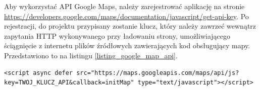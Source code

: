 Aby wykorzystać API Google Maps, należy zarejestrować aplikację na stronie \url{https://developers.google.com/maps/documentation/javascript/get-api-key}. Po rejestracji, do projektu przypisany zostanie klucz, który należy zawrzeć wewnątrz zapytania HTTP wykonywanego przy ładowaniu strony, umożliwiającego ściągnięcie z internetu plików źródłowych zawierających kod obsługujący mapy. Przedstawiono to na listingu \ref{listing_google_map_api}.

\begin{lstlisting}[label=listing_google_map_api, caption=Fragment kodu pozwalający na użycie API Google Maps]
<script async defer src="https://maps.googleapis.com/maps/api/js?key=TWOJ_KLUCZ_API&callback=initMap" type="text/javascript"></script>
\end{lstlisting}

